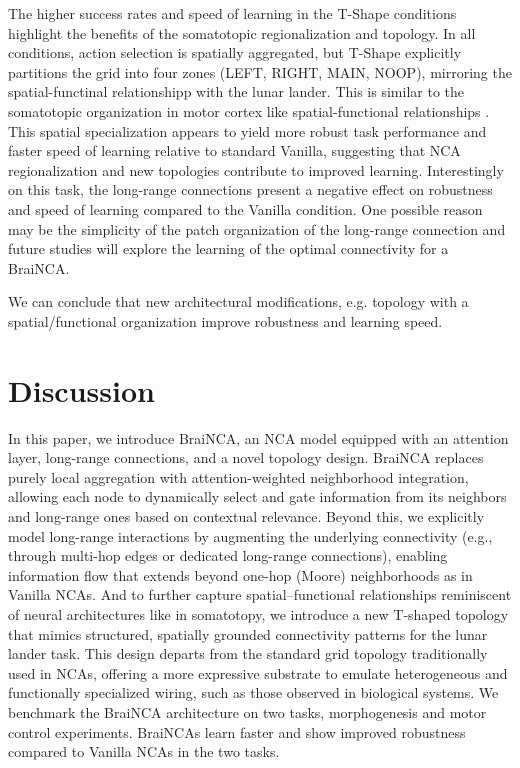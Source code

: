 \documentclass[letterpaper]{article}
\begin{document}
The higher success rates and speed of learning in the  T-Shape conditions  highlight the benefits of the somatotopic regionalization and topology. In all conditions, action selection is spatially aggregated, but T-Shape explicitly partitions the grid into four zones (LEFT, RIGHT, MAIN, NOOP), mirroring the spatial-functinal relationshipp with the lunar lander. This is similar to the somatotopic organization in motor cortex like spatial-functional relationships \cite{schieber2001constraints}. This spatial specialization appears to yield more robust task performance and faster speed of learning relative to standard Vanilla, suggesting that NCA regionalization and new topologies contribute to improved learning. Interestingly on this task, the long-range connections present a negative effect on robustness and speed of learning compared to the Vanilla condition. One possible reason may be the simplicity of the patch organization of the long-range connection and future studies will explore the learning of the optimal connectivity for a BraiNCA.

We can conclude that new architectural modifications, e.g. topology with a spatial/functional organization improve robustness and learning speed.

\section{Discussion}

In this paper, we introduce BraiNCA, an NCA model equipped with an attention layer, long-range connections, and a novel topology design. BraiNCA replaces purely local aggregation with attention-weighted neighborhood integration, allowing each node to dynamically select and gate information from its neighbors and long-range ones based on contextual relevance. Beyond this, we explicitly model long-range interactions by augmenting the underlying connectivity (e.g., through multi-hop edges or dedicated long-range connections), enabling information flow that extends beyond one-hop (Moore) neighborhoods as in Vanilla NCAs. And to further capture spatial–functional relationships reminiscent of neural architectures like in somatotopy, we introduce a new T-shaped topology that mimics structured, spatially grounded connectivity patterns for the lunar lander task. This design departs from the standard grid topology traditionally used in NCAs, offering a more expressive substrate to emulate heterogeneous and functionally specialized wiring, such as those observed in biological systems. We benchmark the BraiNCA architecture on two tasks, morphogenesis and motor control experiments. 
BraiNCAs learn faster and show improved robustness compared to Vanilla NCAs in the two tasks.
\end{document}
